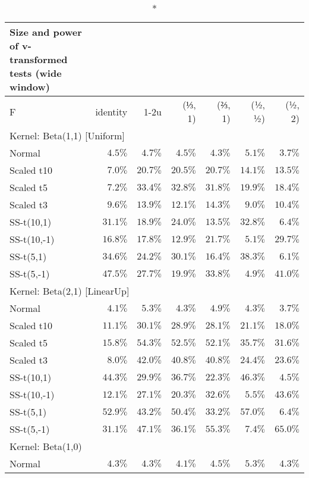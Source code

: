 \setlength{\LTpost}{0mm}
\begin{longtable}{lrrrrrr}
\caption*{
{\large Size and power of v-transformed tests (wide window)}
} \\ 
\toprule
F & identity & \textbar{}1-2u\textbar{} & (⅓, 1) & (⅔, 1) & (½, ½) & (½, 2) \\ 
\midrule
\multicolumn{7}{l}{Kernel: Beta(1,1) [Uniform]} \\ 
\midrule
Normal & $4.5\%$ & $4.7\%$ & $4.5\%$ & $4.3\%$ & $5.1\%$ & $3.7\%$ \\ 
Scaled t10 & $7.0\%$ & $20.7\%$ & $20.5\%$ & $20.7\%$ & $14.1\%$ & $13.5\%$ \\ 
Scaled t5 & $7.2\%$ & $33.4\%$ & $32.8\%$ & $31.8\%$ & $19.9\%$ & $18.4\%$ \\ 
Scaled t3 & $9.6\%$ & $13.9\%$ & $12.1\%$ & $14.3\%$ & $9.0\%$ & $10.4\%$ \\ 
SS-t(10,1) & $31.1\%$ & $18.9\%$ & $24.0\%$ & $13.5\%$ & $32.8\%$ & $6.4\%$ \\ 
SS-t(10,-1) & $16.8\%$ & $17.8\%$ & $12.9\%$ & $21.7\%$ & $5.1\%$ & $29.7\%$ \\ 
SS-t(5,1) & $34.6\%$ & $24.2\%$ & $30.1\%$ & $16.4\%$ & $38.3\%$ & $6.1\%$ \\ 
SS-t(5,-1) & $47.5\%$ & $27.7\%$ & $19.9\%$ & $33.8\%$ & $4.9\%$ & $41.0\%$ \\ 
\midrule
\multicolumn{7}{l}{Kernel: Beta(2,1) [LinearUp]} \\ 
\midrule
Normal & $4.1\%$ & $5.3\%$ & $4.3\%$ & $4.9\%$ & $4.3\%$ & $3.7\%$ \\ 
Scaled t10 & $11.1\%$ & $30.1\%$ & $28.9\%$ & $28.1\%$ & $21.1\%$ & $18.0\%$ \\ 
Scaled t5 & $15.8\%$ & $54.3\%$ & $52.5\%$ & $52.1\%$ & $35.7\%$ & $31.6\%$ \\ 
Scaled t3 & $8.0\%$ & $42.0\%$ & $40.8\%$ & $40.8\%$ & $24.4\%$ & $23.6\%$ \\ 
SS-t(10,1) & $44.3\%$ & $29.9\%$ & $36.7\%$ & $22.3\%$ & $46.3\%$ & $4.5\%$ \\ 
SS-t(10,-1) & $12.1\%$ & $27.1\%$ & $20.3\%$ & $32.6\%$ & $5.5\%$ & $43.6\%$ \\ 
SS-t(5,1) & $52.9\%$ & $43.2\%$ & $50.4\%$ & $33.2\%$ & $57.0\%$ & $6.4\%$ \\ 
SS-t(5,-1) & $31.1\%$ & $47.1\%$ & $36.1\%$ & $55.3\%$ & $7.4\%$ & $65.0\%$ \\ 
\midrule
\multicolumn{7}{l}{Kernel: Beta(1,0)} \\ 
\midrule
Normal & $4.3\%$ & $4.3\%$ & $4.1\%$ & $4.5\%$ & $5.3\%$ & $4.3\%$ \\ 

\end{longtable}
